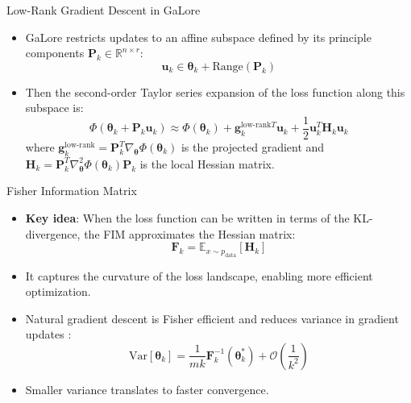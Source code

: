 \documentclass{beamer}
\begin{document}
\begin{frame}{Low-Rank Gradient Descent in GaLore}
    \begin{itemize}
        \item GaLore restricts updates to an affine subspace defined by its principle components \(\mathbf{P}_k \in \mathbb{R}^{n \times r}\):
        \[
            \mathbf{u}_k \in \mathbf{\theta}_k + \text{Range}(\mathbf{P}_k)
        \]
        \item Then the second-order Taylor series expansion of the loss function along this subspace is:
        \[
            \Phi(\mathbf{\theta}_k + \mathbf{P}_k \mathbf{u}_k) \approx \Phi(\mathbf{\theta}_k) + \mathbf{g}_{k}^{\text{low-rank} T} \mathbf{u}_k + \frac{1}{2} \mathbf{u}_k^T \mathbf{H}_k \mathbf{u}_k
        \]
        where \(\mathbf{g}_{k}^{\text{low-rank}} = \mathbf{P}_k^T \nabla_{\mathbf{\theta}} \Phi(\mathbf{\theta}_k)\) is the projected gradient and \(\mathbf{H}_k = \mathbf{P}_k^T \nabla^2_{\mathbf{\theta}} \Phi(\mathbf{\theta}_k) \mathbf{P}_k\) is the local Hessian matrix.
    \end{itemize}
\end{frame}

\begin{frame}{Fisher Information Matrix}
    \begin{itemize}
        \item \textbf{Key idea}: When the loss function can be written in terms of the KL-divergence, the FIM approximates the Hessian matrix:
        \[
            \mathbf{F}_k = \mathbb{E}_{x \sim p_{\text{data}}} [ \mathbf{H}_k ]
        \]
        \item It captures the curvature of the loss landscape, enabling more efficient optimization.
        \item Natural gradient descent is Fisher efficient and reduces variance in gradient updates \citep{amariNaturalGradientWorks1998}:
        \[
            \text{Var}[\mathbf{\theta}_k] = \frac{1}{mk} \mathbf{F}_k^{-1}(\mathbf{\theta}_k^*) + \mathcal{O}\left(\frac{1}{k^2}\right)
        \]
        \item Smaller variance translates to faster convergence.
    \end{itemize}
\end{frame}
\end{document}
